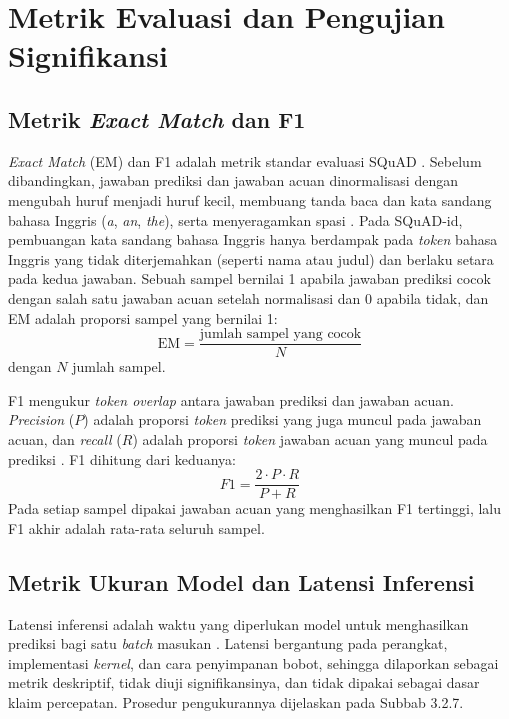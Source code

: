 \section{Metrik Evaluasi dan Pengujian Signifikansi}

\subsection{Metrik \textit{Exact Match} dan F1}

\textit{Exact Match} (EM) dan F1 adalah metrik standar evaluasi SQuAD \parencite{rajpurkar2016squad}. Sebelum dibandingkan, jawaban prediksi dan jawaban acuan dinormalisasi dengan mengubah huruf menjadi huruf kecil, membuang tanda baca dan kata sandang bahasa Inggris (\textit{a}, \textit{an}, \textit{the}), serta menyeragamkan spasi \parencite{rajpurkar2016squad}. Pada SQuAD-id, pembuangan kata sandang bahasa Inggris hanya berdampak pada \textit{token} bahasa Inggris yang tidak diterjemahkan (seperti nama atau judul) dan berlaku setara pada kedua jawaban. Sebuah sampel bernilai 1 apabila jawaban prediksi cocok dengan salah satu jawaban acuan setelah normalisasi dan 0 apabila tidak, dan EM adalah proporsi sampel yang bernilai 1:
\begin{equation}
  \mathrm{EM} = \frac{\text{jumlah sampel yang cocok}}{N}
  \label{eq:em}
\end{equation}
\noindent dengan $N$ jumlah sampel.

F1 mengukur \textit{token overlap} antara jawaban prediksi dan jawaban acuan. \textit{Precision} ($P$) adalah proporsi \textit{token} prediksi yang juga muncul pada jawaban acuan, dan \textit{recall} ($R$) adalah proporsi \textit{token} jawaban acuan yang muncul pada prediksi \parencite{rajpurkar2016squad}. F1 dihitung dari keduanya:
\begin{equation}
  F1 = \frac{2 \cdot P \cdot R}{P + R}
  \label{eq:f1}
\end{equation}
Pada setiap sampel dipakai jawaban acuan yang menghasilkan F1 tertinggi, lalu F1 akhir adalah rata-rata seluruh sampel.

\subsection{Metrik Ukuran Model dan Latensi Inferensi}

Latensi inferensi adalah waktu yang diperlukan model untuk menghasilkan prediksi bagi satu \textit{batch} masukan \parencite{gholami2021survey}. Latensi bergantung pada perangkat, implementasi \textit{kernel}, dan cara penyimpanan bobot, sehingga dilaporkan sebagai metrik deskriptif, tidak diuji signifikansinya, dan tidak dipakai sebagai dasar klaim percepatan. Prosedur pengukurannya dijelaskan pada Subbab 3.2.7.

